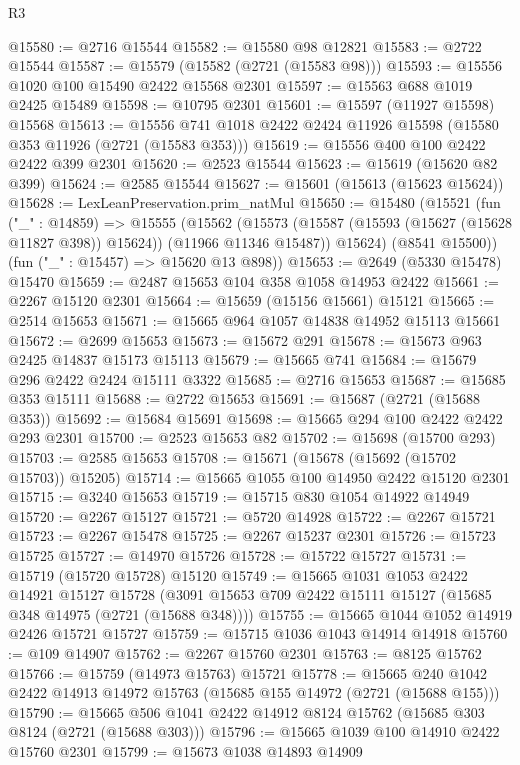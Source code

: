 \begin{lexlean}{R3}
\begin{coremodule}
@15580 := @2716 @15544
@15582 := @15580 @98 @12821
@15583 := @2722 @15544
@15587 := @15579 (@15582 (@2721 (@15583 @98)))
@15593 := @15556 @1020 @100 @15490 @2422 @15568 @2301
@15597 := @15563 @688 @1019 @2425 @15489
@15598 := @10795 @2301
@15601 := @15597 (@11927 @15598) @15568
@15613 := @15556 @741 @1018 @2422 @2424 @11926 @15598 (@15580 @353 @11926 (@2721 (@15583 @353)))
@15619 := @15556 @400 @100 @2422 @2422 @399 @2301
@15620 := @2523 @15544
@15623 := @15619 (@15620 @82 @399)
@15624 := @2585 @15544
@15627 := @15601 (@15613 (@15623 @15624))
@15628 := LexLeanPreservation.prim_natMul
@15650 := @15480
    (@15521
      (fun ("_" : @14859) =>
      @15555
        (@15562
          (@15573 (@15587 (@15593 (@15627 (@15628 @11827 @398)) @15624)) (@11966 @11346 @15487))
          @15624)
        (@8541 @15500))
      (fun ("_" : @15457) => @15620 @13 @898))
@15653 := @2649 (@5330 @15478) @15470
@15659 := @2487 @15653 @104 @358 @1058 @14953 @2422
@15661 := @2267 @15120 @2301
@15664 := @15659 (@15156 @15661) @15121
@15665 := @2514 @15653
@15671 := @15665 @964 @1057 @14838 @14952 @15113 @15661
@15672 := @2699 @15653
@15673 := @15672 @291
@15678 := @15673 @963 @2425 @14837 @15173 @15113
@15679 := @15665 @741
@15684 := @15679 @296 @2422 @2424 @15111 @3322
@15685 := @2716 @15653
@15687 := @15685 @353 @15111
@15688 := @2722 @15653
@15691 := @15687 (@2721 (@15688 @353))
@15692 := @15684 @15691
@15698 := @15665 @294 @100 @2422 @2422 @293 @2301
@15700 := @2523 @15653 @82
@15702 := @15698 (@15700 @293)
@15703 := @2585 @15653
@15708 := @15671 (@15678 (@15692 (@15702 @15703)) @15205)
@15714 := @15665 @1055 @100 @14950 @2422 @15120 @2301
@15715 := @3240 @15653
@15719 := @15715 @830 @1054 @14922 @14949
@15720 := @2267 @15127
@15721 := @5720 @14928
@15722 := @2267 @15721
@15723 := @2267 @15478
@15725 := @2267 @15237 @2301
@15726 := @15723 @15725
@15727 := @14970 @15726
@15728 := @15722 @15727
@15731 := @15719 (@15720 @15728) @15120
@15749 := @15665
    @1031
    @1053
    @2422
    @14921
    @15127
    @15728
    (@3091 @15653 @709 @2422 @15111 @15127 (@15685 @348 @14975 (@2721 (@15688 @348))))
@15755 := @15665 @1044 @1052 @14919 @2426 @15721 @15727
@15759 := @15715 @1036 @1043 @14914 @14918
@15760 := @109 @14907
@15762 := @2267 @15760 @2301
@15763 := @8125 @15762
@15766 := @15759 (@14973 @15763) @15721
@15778 := @15665 @240 @1042 @2422 @14913 @14972 @15763 (@15685 @155 @14972 (@2721 (@15688 @155)))
@15790 := @15665 @506 @1041 @2422 @14912 @8124 @15762 (@15685 @303 @8124 (@2721 (@15688 @303)))
@15796 := @15665 @1039 @100 @14910 @2422 @15760 @2301
@15799 := @15673 @1038 @14893 @14909

\end{coremodule}
\end{lexlean}
